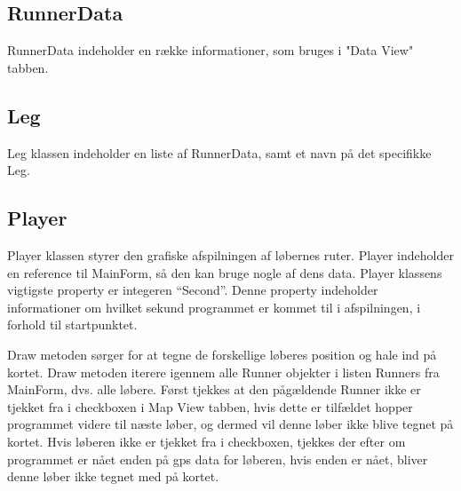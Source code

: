 \subsection{RunnerData}
RunnerData indeholder en række informationer, som bruges i "Data View" tabben.

\subsection{Leg}
Leg klassen indeholder en liste af RunnerData, samt et navn på det specifikke Leg.

\subsection{Player}
Player klassen styrer den grafiske afspilningen af løbernes ruter. Player indeholder en reference til MainForm, så den kan bruge nogle af dens data. \newline
Player klassens vigtigste property er integeren “Second”. Denne property indeholder informationer om hvilket sekund programmet er kommet til i afspilningen, i forhold til startpunktet. 

Draw metoden sørger for at tegne de forskellige løberes position og hale ind på kortet.
Draw metoden iterere igennem alle Runner objekter i listen Runners fra MainForm, dvs. alle løbere.\newline
Først tjekkes at den pågældende Runner ikke er tjekket fra i checkboxen i Map View tabben, hvis dette er tilfældet hopper programmet videre til næste løber, og dermed vil denne løber ikke blive tegnet på kortet. \newline
Hvis løberen ikke er tjekket fra i checkboxen, tjekkes der efter om programmet er nået enden på gps data for løberen, hvis enden er nået, bliver denne løber ikke tegnet med på kortet.

